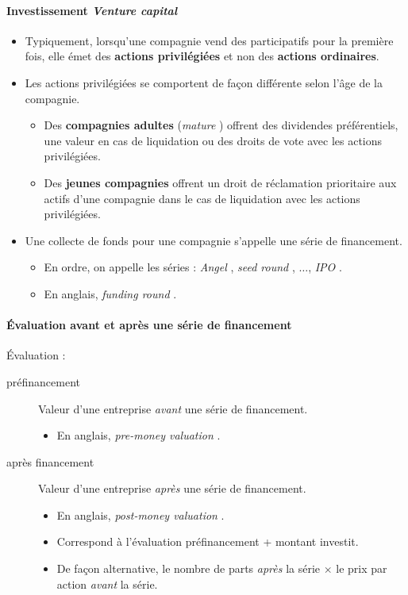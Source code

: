 \documentclass[10pt, french]{article}
\begin{document}
\begin{multicols*}{2}
\paragraph{Investissement \og \textit{Venture capital} \fg{}}
\begin{itemize}
	\item	Typiquement, lorsqu'une compagnie vend des participatifs pour la première fois, elle émet des \textbf{actions privilégiées} et non des \textbf{actions ordinaires}.
	\item	Les actions privilégiées se comportent de façon différente selon l'âge de la compagnie.
		\begin{itemize}
		\item	Des \textbf{compagnies adultes} (\og \textit{mature} \fg{}) offrent des dividendes préférentiels, une valeur en cas de liquidation ou des droits de vote avec les actions privilégiées.
		\item	Des \textbf{jeunes compagnies} offrent un droit de réclamation prioritaire aux actifs d'une compagnie dans le cas de liquidation avec les actions privilégiées.
		\end{itemize}		 
	\item	Une collecte de fonds pour une compagnie s'appelle une série de financement.
		\begin{itemize}
		\item	En ordre, on appelle les séries : \og \textit{Angel} \fg{}, \og \textit{seed round} \fg{}, $\dots$, \og \textit{IPO} \fg{}.
		\item	En anglais, \og \textit{funding round} \fg{}.
		\end{itemize}
\end{itemize}


\paragraph{Évaluation avant et après une série de financement}
Évaluation : 
\begin{description}
	\item[préfinancement]	Valeur d'une entreprise \textit{avant} une série de financement.
		\begin{itemize}
		\item	En anglais, \og \textit{pre-money valuation} \fg{}.
		\end{itemize}
	\item[après financement]	Valeur d'une entreprise \textit{après} une série de financement.
		\begin{itemize}
		\item	En anglais, \og \textit{post-money valuation} \fg{}.
		\item	Correspond à l'évaluation préfinancement + montant investit.
		\item	De façon alternative, le nombre de parts \textit{après} la série $\times$ le prix par action \textit{avant} la série.
		\end{itemize}
\end{description}


\end{multicols*}
\end{document}
